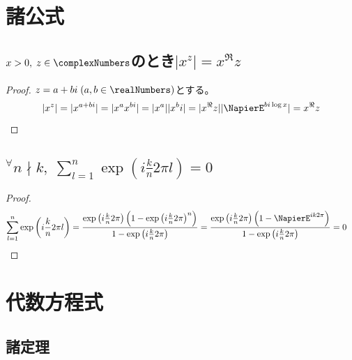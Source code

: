     \section{諸公式}
        \subsection{\texorpdfstring{$x>0,\;z\in\complexNumbers$}{x>0, zは複素数}のとき\texorpdfstring{$|x^z|=x^\Re{z}$}{x\string^zの絶対値はx\string^Re(z)}}
            \begin{proof}
                \quad\par
                $z = a + bi\;(a,b\in\realNumbers)$とする。
                \[ |x^z| = |x^{a+bi}| = |x^a x^{bi}| = |x^a| |x^bi| = |x^\Re{z}| |\NapierE^{bi\log{x}}| = x^\Re{z} \]
            \end{proof}
        \subsection{\texorpdfstring{$^\forall n\nmid k,\;\sum_{l=1}^n{\exp\left(i\frac{k}{n}2\pi l\right)} = 0$}{kはnの倍数でないとする。exp(ikl2π/n)をl=1,2...,nについて足すと0である。}}
            \label{fml:花びら定理}
            \begin{proof}
                \begin{align*}
                    \sum_{l=1}^n{\exp\left(i\frac{k}{n}2\pi l\right)} &= \frac{\exp\left(i\frac{k}{n}2\pi\right)\left(1-\exp\left(i\frac{k}{n}2\pi\right)^n\right)}{1-\exp\left(i\frac{k}{n}2\pi\right)} = \frac{\exp\left(i\frac{k}{n}2\pi\right)\left(1-\NapierE^{ik2\pi}\right)}{1-\exp\left(i\frac{k}{n}2\pi\right)} =0
                \end{align*}
            \end{proof}
    \section{代数方程式}
        \subsection{諸定理}
